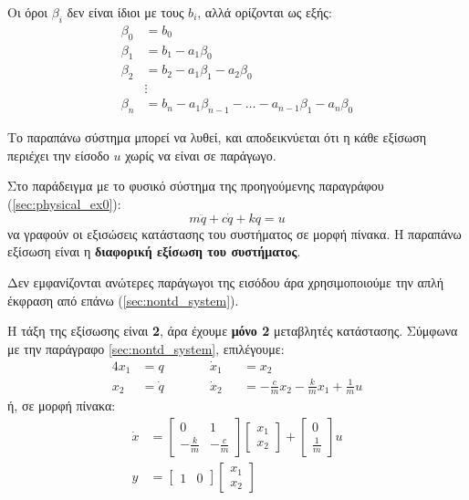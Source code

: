 \documentclass[11pt,a4paper,notitlepage,fleqn]{article}
\begin{document}
\begin{itemize}
     Οι όροι \( \beta_i \) δεν είναι ίδιοι με τους \( b_i \), αλλά ορίζονται ως εξής:
     \begin{align*}
     	\beta_0 &= b_0 \\
     	\beta_1 &= b_1 - a_1\beta_0\\
     	\beta_2 &= b_2 - a_1\beta_1 - a_2\beta_0\\
     	&\vdots\\
     	\beta_n &= b_n - a_1\beta_{n-1}-\dots - a_{n-1}\beta_1 - a_n\beta_0
     \end{align*}
     
     Το παραπάνω σύστημα μπορεί να λυθεί, και αποδεικνύεται ότι η κάθε εξίσωση περιέχει
     την είσοδο \( u \) χωρίς να είναι σε παράγωγο.
\end{itemize}

\begin{exercise}[Παράδειγμα]
	Στο παράδειγμα με το φυσικό σύστημα της προηγούμενης παραγράφου (\autoref{sec:physical_ex0}):
	\[
	m\ddot q + c\dot q + kq = u
	\]
	να γραφούν οι εξισώσεις κατάστασης του συστήματος σε μορφή πίνακα.
	\tcblower
	Η παραπάνω εξίσωση είναι η \textbf{διαφορική εξίσωση του συστήματος}.
	
	Δεν εμφανίζονται ανώτερες παράγωγοι της εισόδου άρα χρησιμοποιούμε την απλή έκφραση
	από επάνω (\autoref{sec:nontd_system}).
	
	Η τάξη της εξίσωσης είναι \textbf{2}, άρα έχουμε \textbf{μόνο 2} μεταβλητές κατάστασης.
	Σύμφωνα με την παράγραφο \autoref{sec:nontd_system}, επιλέγουμε:
	\begin{alignat*}{4}
		x_1 &=q \qquad && \dot x_1&&=x_2 \\
		x_2&=\dot q \qquad && \dot x_2 &&= -\frac{c}{m}x_2 - \frac{k}{m}x_1
		+ \frac{1}{m}u
	\end{alignat*}
	ή, σε μορφή πίνακα:
	\begin{align*}
		\dot x &= \left[\begin{matrix}
		0 & 1 \\ -\frac{k}{m} & -\frac{c}{m}
		\end{matrix}\right]\left[\begin{matrix}
		x_1\\x_2
		\end{matrix}
		\right]+\left[\begin{matrix}
		0\\ \frac{1}{m}
		\end{matrix}\right]u\\
		y &= \left[\begin{matrix}
		1 & 0
		\end{matrix}\right]\left[\begin{matrix}
		x_1 \\ x_2
		\end{matrix}\right]
	\end{align*}
\end{exercise}
\end{document}
